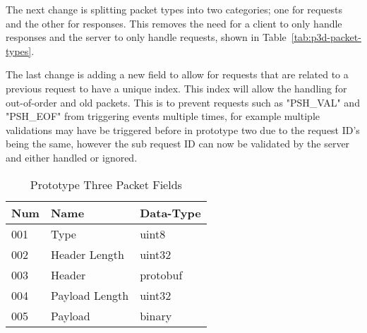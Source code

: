The next change is splitting packet types into two categories; one for requests and the other for responses. This removes the need for a client to only handle responses and the server to only handle requests, shown in Table~\ref{tab:p3d-packet-types}.

The last change is adding a new field to allow for requests that are related to a previous request to have a unique index. This index will allow the handling for out-of-order and old packets. This is to prevent requests such as "PSH\_VAL" and "PSH\_EOF" from triggering events multiple times, for example multiple validations may have be triggered before in prototype two due to the request ID's being the same, however the sub request ID can now be validated by the server and either handled or ignored.

\FloatBarrier

\begin{table}[ht]
	\caption{Prototype Three Packet Fields}
	\label{tab:p3d-packet-fields}
	\centering
	\begin{tabular}{ l l l }
		\hline
		\textbf{Num} & \textbf{Name}  & \textbf{Data-Type} \\
		\hline
		001          & Type           & uint8              \\
		\hline
		002          & Header Length  & uint32             \\
		\hline
		003          & Header         & protobuf           \\
		\hline
		004          & Payload Length & uint32             \\
		\hline
		005          & Payload        & binary             \\
		\hline
	\end{tabular}
\end{table}

\FloatBarrier

